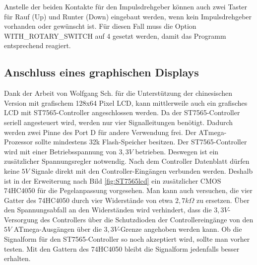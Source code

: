 Anstelle der beiden Kontakte für den Impulsdrehgeber können auch zwei Taster für Rauf (Up) und Runter (Down)
eingebaut werden, wenn kein Impulsdrehgeber vorhanden oder gewünscht ist.
Für diesen Fall muss die Option WITH\_ROTARY\_SWITCH auf 4 gesetzt werden, damit das Programm
entsprechend reagiert.

\subsection{Anschluss eines graphischen Displays}

Dank der Arbeit von Wolfgang Sch. für die Unterstützung der chinesischen Version mit
grafischem 128x64 Pixel LCD, kann mittlerweile auch ein grafisches LCD
mit ST7565-Controller angeschlossen werden. Da der ST7565-Controller seriell angesteuert wird,
werden nur vier Signalleitungen benötigt.
Dadurch werden zwei Pinne des Port D für andere Verwendung frei.
Der ATmega-Prozessor sollte mindestens 32k Flash-Speicher besitzen.
Der ST7565-Controller wird mit einer Betriebsspannung von \(3,3V\) betrieben.
Deswegen ist ein zusätzlicher Spannungsregler notwendig.
Nach dem Controller Datenblatt dürfen keine \(5V\) Signale direkt mit den Controller-Eingängen verbunden
werden. Deshalb ist in der Erweiterung nach Bild \ref{fig:ST7565lcd} ein zusätzlicher CMOS 74HC4050
für die Pegelanpassung vorgesehen. 
Man kann auch versuchen, die vier Gatter des 74HC4050 durch vier Widerstände von etwa \(2,7k\Omega\) zu ersetzen.
Über den Spannungsabfall an den Widerständen wird verhindert, dass die \(3,3V\)-Versorgung des Controllers über die Schutzdioden
der Controllereingänge von den \(5V\) ATmega-Ausgängen über die \(3,3V\)-Grenze angehoben werden kann.
Ob die Signalform für den ST7565-Controller so noch akzeptiert wird, sollte man vorher testen.
Mit den Gattern des 74HC4050 bleibt die Signalform jedenfalls besser erhalten.\\
 
